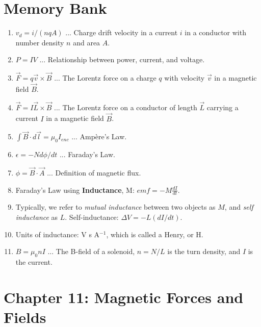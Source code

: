 \documentclass[10pt]{article}
\begin{document}
\maketitle

\section{Memory Bank}

\begin{enumerate}
\item $v_d = i/(nqA)$ ... Charge drift velocity in a current $i$ in a conductor with number density $n$ and area $A$.
\item $P = I V$ ... Relationship between power, current, and voltage.
\item $\vec{F} = q\vec{v} \times \vec{B}$ ... The Lorentz force on a charge $q$ with velocity $\vec{v}$ in a magnetic field $\vec{B}$.
\item $\vec{F} = I\vec{L} \times \vec{B}$ ... The Lorentz force on a conductor of length $\vec{L}$ carrying a current $I$ in a magnetic field $\vec{B}$.
\item $\int \vec{B} \cdot d\vec{l} = \mu_0 I_{enc}$ ... Amp\`{e}re's Law.
\item $\epsilon = -N d\phi/dt$ ... Faraday's Law.
\item $\phi = \vec{B} \cdot \vec{A}$ ... Definition of magnetic flux.
\item Faraday's Law using \textbf{Inductance}, M: $emf = -M \frac{dI}{dt}$.
\item Typically, we refer to \textit{mutual inductance} between two objects as $M$, and \textit{self inductance} as $L$.  Self-inductance: $\Delta V = -L (dI/dt)$.
\item Units of inductance: V s A$^{-1}$, which is called a Henry, or H.
\item $B = \mu_0 n I$ ... The B-field of a solenoid, $n = N/L$ is the turn density, and $I$ is the current.
\end{enumerate}

\clearpage

\section{Chapter 11: Magnetic Forces and Fields}
\end{document}
